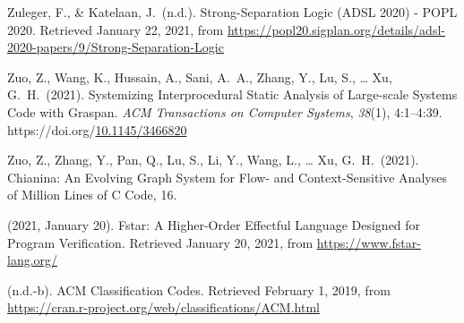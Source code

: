 \documentclass[12pt,twoside]{article}
\begin{document}
{\begin{thebibliography}{1079}
\mdbibitemlabel{}Zuleger, F., \& Katelaan, J.~(n.d.). Strong-Separation Logic (ADSL 2020) - POPL 2020. Retrieved January 22, 2021, from \href{https://popl20.sigplan.org/details/adsl-2020-papers/9/Strong-Separation-Logic}{{\ttfamily https://\hspace{0pt}popl20.\hspace{0pt}sigplan.\hspace{0pt}org/\hspace{0pt}details/\hspace{0pt}adsl-\hspace{0pt}2020-\hspace{0pt}papers/\hspace{0pt}9/\hspace{0pt}Strong-\hspace{0pt}Separation-\hspace{0pt}Logic}}%

\mdbibitemlabel{}Zuo, Z., Wang, K., Hussain, A., Sani, A.~A., Zhang, Y., Lu, S., … Xu, G.~H.~(2021). Systemizing Interprocedural Static Analysis of Large-scale Systems Code with Graspan. \emph{ACM Transactions on Computer Systems}, \emph{38}(1), 4:1–4:39. https://doi.org/\href{https://dx.doi.org/10.1145/3466820}{10.1145/3466820}%

\mdbibitemlabel{}Zuo, Z., Zhang, Y., Pan, Q., Lu, S., Li, Y., Wang, L., … Xu, G.~H.~(2021). Chianina: An Evolving Graph System for Flow- and Context-Sensitive Analyses of Million Lines of C Code, 16.%

\mdbibitemlabel{}(2021, January 20). Fstar: A Higher-Order Effectful Language Designed for Program Verification. Retrieved January 20, 2021, from \href{https://www.fstar-lang.org/}{{\ttfamily https://\hspace{0pt}www.\hspace{0pt}fstar-\hspace{0pt}lang.\hspace{0pt}org/\hspace{0pt}}}%

\mdbibitemlabel{}(n.d.-b). ACM Classification Codes. Retrieved February 1, 2019, from \href{https://cran.r-project.org/web/classifications/ACM.html}{{\ttfamily https://\hspace{0pt}cran.\hspace{0pt}r-\hspace{0pt}project.\hspace{0pt}org/\hspace{0pt}web/\hspace{0pt}classifications/\hspace{0pt}ACM.\hspace{0pt}html}}%


\end{thebibliography}}
\end{document}
